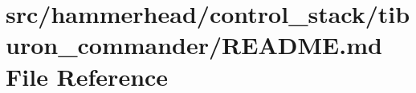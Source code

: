 \hypertarget{control__stack_2tiburon__commander_2README_8md}{}\section{src/hammerhead/control\+\_\+stack/tiburon\+\_\+commander/\+R\+E\+A\+D\+ME.md File Reference}
\label{control__stack_2tiburon__commander_2README_8md}
